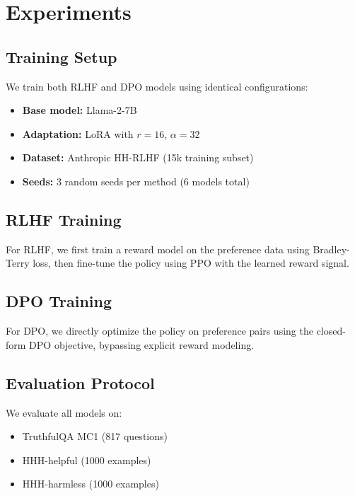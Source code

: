 \section{Experiments}

\subsection{Training Setup}

We train both RLHF and DPO models using identical configurations:

\begin{itemize}
    \item \textbf{Base model:} Llama-2-7B \citep{touvron2023llama}
    \item \textbf{Adaptation:} LoRA \citep{hu2022lora} with $r=16$, $\alpha=32$
    \item \textbf{Dataset:} Anthropic HH-RLHF (15k training subset)
    \item \textbf{Seeds:} 3 random seeds per method (6 models total)
\end{itemize}

\subsection{RLHF Training}

For RLHF, we first train a reward model on the preference data using Bradley-Terry loss, then fine-tune the policy using PPO with the learned reward signal.

\subsection{DPO Training}

For DPO, we directly optimize the policy on preference pairs using the closed-form DPO objective, bypassing explicit reward modeling.

\subsection{Evaluation Protocol}

We evaluate all models on:
\begin{itemize}
    \item TruthfulQA MC1 (817 questions)
    \item HHH-helpful (1000 examples)
    \item HHH-harmless (1000 examples)
\end{itemize}
